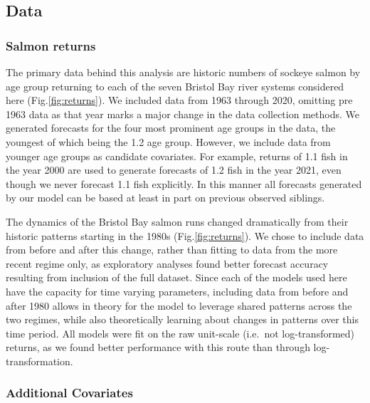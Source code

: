 \documentclass[
]{article}
\begin{document}
\hypertarget{data}{%
\subsection{Data}\label{data}}

\hypertarget{salmon-returns}{%
\subsubsection{Salmon returns}\label{salmon-returns}}

The primary data behind this analysis are historic numbers of sockeye salmon by age group returning to each of the seven Bristol Bay river systems considered here (Fig.\ref{fig:returns}). We included data from 1963 through 2020, omitting pre 1963 data as that year marks a major change in the data collection methods. We generated forecasts for the four most prominent age groups in the data, the youngest of which being the 1.2 age group. However, we include data from younger age groups as candidate covariates. For example, returns of 1.1 fish in the year 2000 are used to generate forecasts of 1.2 fish in the year 2021, even though we never forecast 1.1 fish explicitly. In this manner all forecasts generated by our model can be based at least in part on previous observed siblings.

The dynamics of the Bristol Bay salmon runs changed dramatically from their historic patterns starting in the 1980s (Fig.\ref{fig:returns}). We chose to include data from before and after this change, rather than fitting to data from the more recent regime only, as exploratory analyses found better forecast accuracy resulting from inclusion of the full dataset. Since each of the models used here have the capacity for time varying parameters, including data from before and after 1980 allows in theory for the model to leverage shared patterns across the two regimes, while also theoretically learning about changes in patterns over this time period. All models were fit on the raw unit-scale (i.e.~not log-transformed) returns, as we found better performance with this route than through log-transformation.

\hypertarget{additional-covariates}{%
\subsubsection{Additional Covariates}\label{additional-covariates}}
\end{document}
